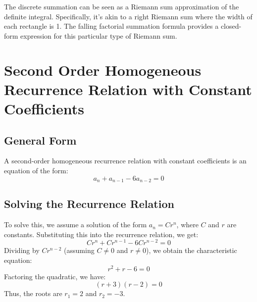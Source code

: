 \documentclass{report}
\begin{document}


\sol
The discrete summation can be seen as a Riemann sum approximation of the definite integral.  Specifically, it's akin to a right Riemann sum where the width of each rectangle is 1. The falling factorial summation formula provides a closed-form expression for this particular type of Riemann sum.



\section{Second Order Homogeneous Recurrence Relation with Constant Coefficients}

\subsection{General Form}

A second-order homogeneous recurrence relation with constant coefficients is an equation of the form:
$$a_n + a_{n-1} - 6a_{n-2} = 0$$

\subsection{Solving the Recurrence Relation}

To solve this, we assume a solution of the form $a_n = Cr^n$, where $C$ and $r$ are constants. Substituting this into the recurrence relation, we get:
$$Cr^n + Cr^{n-1} - 6Cr^{n-2} = 0$$
Dividing by $Cr^{n-2}$ (assuming $C \neq 0$ and $r \neq 0$), we obtain the characteristic equation:
$$r^2 + r - 6 = 0$$
Factoring the quadratic, we have:
$$(r+3)(r-2) = 0$$
Thus, the roots are $r_1 = 2$ and $r_2 = -3$.
\end{document}
